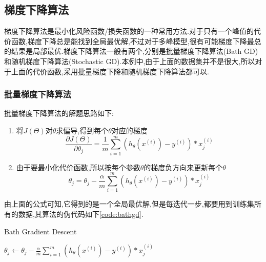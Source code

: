 \subsection{梯度下降算法}
梯度下降算法是最小化风险函数/损失函数的一种常用方法.对于只有一个峰值的代价函数,梯度下降总是能找到全局最优解,不过对于多峰模型,很有可能梯度下降最总的结果是局部最优.梯度下降算法一般有两个,分别是批量梯度下降算法(Bath GD)和随机梯度下降算法(Stochastic GD).本例中,由于上面的数据集并不是很大,所以对于上面的代价函数,采用批量梯度下降和随机梯度下降算法都可以.
\subsubsection{批量梯度下降算法}
批量梯度下降算法的解题思路如下:
\begin{enumerate}
\item 将$J(\Theta)$对$\theta$求偏导,得到每个$\theta$对应的梯度
\begin{equation}
\frac{\partial J(\Theta)}{\partial \theta_j} = 
\frac{1}{m} \sum_{i=1}^m (h_{\theta}(x^{(i)})-y^{(i)})*x_j^{(i)}
\end{equation}
\item 由于要最小化代价函数,所以按每个参数$\theta$的梯度负方向来更新每个$\theta$
\begin{equation}
\theta_j = \theta_j - \frac{\alpha}{m} \sum_{i=1}^m (h_{\theta}(x^{(i)})-y^{(i)})*x_j^{(i)}
\end{equation}
\end{enumerate}
由上面的公式可知,它得到的是一个全局最优解,但是每迭代一步,都要用到训练集所有的数据,其算法的伪代码如下\ref{code:bathgd}.
\begin{algorithm}[h]
\caption{Bath Gradient Descent}
\label{code:bathgd}
\begin{algorithmic}[1]
\Repeat
\State	$\theta_j \gets \theta_j - \frac{\alpha}{m} \sum_{i=1}^m (h_{\theta}(x^{(i)})-y^{(i)})*x_j^{(i)}$ 
\end{algorithmic}
\end{algorithm}


